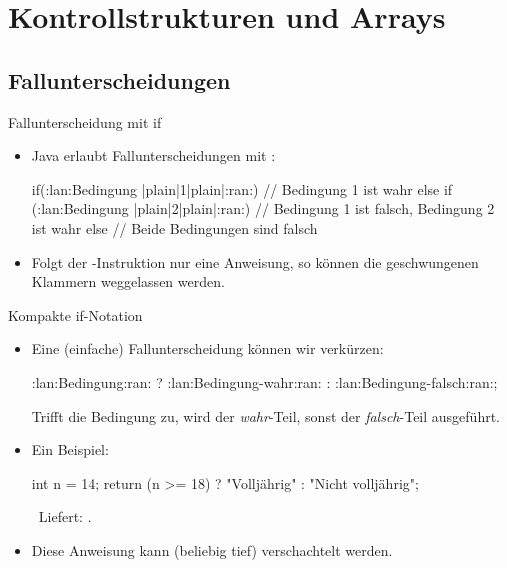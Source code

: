 \section{Kontrollstrukturen und Arrays}
\subsection{Fallunterscheidungen}

\begin{frame}[fragile]{Fallunterscheidung mit if}
    \begin{itemize}[<+(1)->]
        \item Java erlaubt Fallunterscheidungen mit :\pause{}
\begin{plainjava}
if(:lan:Bedingung |plain|1|plain|:ran:){
    // Bedingung 1 ist wahr
} else if (:lan:Bedingung |plain|2|plain|:ran:) {
    // Bedingung 1 ist falsch, Bedingung 2 ist wahr
} else {
    // Beide Bedingungen sind falsch
}
\end{plainjava}
    \item Folgt der -Instruktion nur eine Anweisung,\pause{} so können die geschwungenen Klammern weggelassen werden.
    \end{itemize}
\end{frame}


\begin{frame}[fragile]{Kompakte if-Notation}
    \begin{itemize}[<+(1)->]
        \widei
        \item Eine (einfache) Fallunterscheidung können wir verkürzen:\pause{}
\begin{plainjava}
:lan:Bedingung:ran: ? :lan:Bedingung-wahr:ran: : :lan:Bedingung-falsch:ran:;
\end{plainjava}
        \pause{}Trifft die Bedingung zu, wird der \emph{wahr}-Teil, sonst der \emph{falsch}-Teil ausgeführt.
        \item Ein Beispiel:\pause{}
\begin{plainjava}
int n = 14;
return (n >= 18) ? "Volljährig" : "Nicht volljährig";
\end{plainjava}
        \pause{}\faAngleRight~Liefert: .
        \item Diese Anweisung kann (beliebig tief) verschachtelt werden.
    \end{itemize}
\end{frame}


